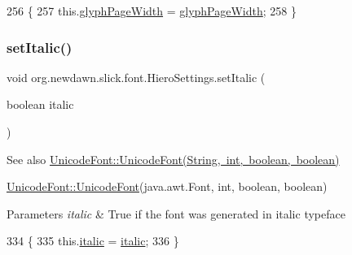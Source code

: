 \begin{DoxyCode}
256                                                       \{
257         this.\mbox{\hyperlink{classorg_1_1newdawn_1_1slick_1_1font_1_1_hiero_settings_aeed4e1a4668cfa3c3dc94d481f68a5c3}{glyphPageWidth}} = \mbox{\hyperlink{classorg_1_1newdawn_1_1slick_1_1font_1_1_hiero_settings_aeed4e1a4668cfa3c3dc94d481f68a5c3}{glyphPageWidth}};
258     \}
\end{DoxyCode}
\mbox{\label{classorg_1_1newdawn_1_1slick_1_1font_1_1_hiero_settings_a57e9fa83e6d32e948b188455bc135fab}} 
\subsubsection{\texorpdfstring{set\+Italic()}{setItalic()}}
{\footnotesize\ttfamily void org.\+newdawn.\+slick.\+font.\+Hiero\+Settings.\+set\+Italic (\begin{DoxyParamCaption}\item[{boolean}]{italic }\end{DoxyParamCaption})\hspace{0.3cm}{\ttfamily [inline]}}

\begin{DoxySeeAlso}{See also}
\mbox{\hyperlink{classorg_1_1newdawn_1_1slick_1_1_unicode_font_a45cb814b2f8c0ec1e8dbc92c4594b33f}{Unicode\+Font\+::\+Unicode\+Font(\+String, int, boolean, boolean)}} 

\mbox{\hyperlink{classorg_1_1newdawn_1_1slick_1_1_unicode_font_acb84ea3da65e6ac55ce2283bc71e41cf}{Unicode\+Font\+::\+Unicode\+Font}}(java.\+awt.\+Font, int, boolean, boolean)
\end{DoxySeeAlso}

\begin{DoxyParams}{Parameters}
{\em italic} & True if the font was generated in italic typeface \\
\hline
\end{DoxyParams}

\begin{DoxyCode}
334                                            \{
335         this.\mbox{\hyperlink{classorg_1_1newdawn_1_1slick_1_1font_1_1_hiero_settings_a4e55c90c505a6a53fa3684288d379e6a}{italic}} = \mbox{\hyperlink{classorg_1_1newdawn_1_1slick_1_1font_1_1_hiero_settings_a4e55c90c505a6a53fa3684288d379e6a}{italic}};
336     \}
\end{DoxyCode}
\mbox{\label{classorg_1_1newdawn_1_1slick_1_1font_1_1_hiero_settings_a8774b78349709339a9a7f3e28164d7ae}} 

